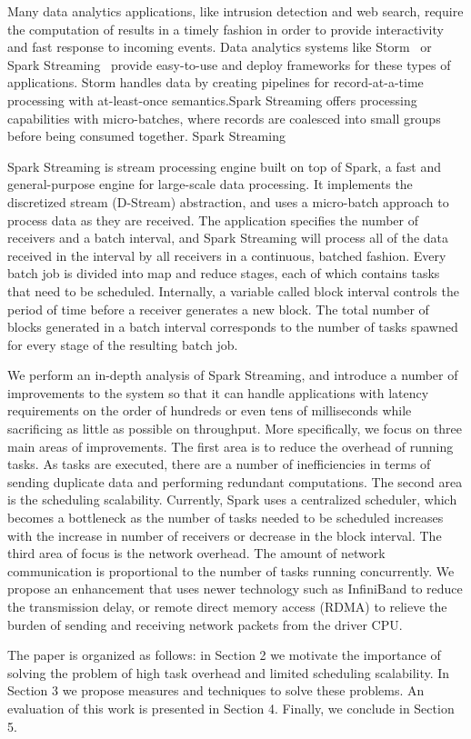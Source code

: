 \noindent

Many data analytics applications, like intrusion detection and web search, require the computation of results in a timely fashion in order to provide interactivity and fast response to incoming events.
Data analytics systems like Storm~\cite{Storm} or Spark Streaming~\cite{SparkStreaming} provide easy-to-use and deploy frameworks for these types of applications. Storm handles data by creating pipelines for record-at-a-time processing with at-least-once semantics.Spark Streaming offers processing capabilities with micro-batches, where records are coalesced into small groups before being consumed together.
Spark Streaming 


Spark Streaming is stream processing engine built on top of Spark, a fast and general-purpose engine for large-scale data processing. It implements the discretized stream (D-Stream) abstraction, and uses a micro-batch approach to process data as they are received. The application specifies the number of receivers and a batch interval, and Spark Streaming will process all of the data received in the interval by all receivers in a continuous, batched fashion. Every batch job is divided into map and reduce stages, each of which contains tasks that need to be scheduled. Internally, a variable called block interval controls the period of time before a receiver generates a new block. The total number of blocks generated in a batch interval corresponds to the number of tasks spawned for every stage of the resulting batch job.

We perform an in-depth analysis of Spark Streaming, and introduce a number of improvements to the system so that it can handle applications with latency requirements on the order of hundreds or even tens of milliseconds while sacrificing as little as possible on throughput. More specifically, we focus on three main areas of improvements. The first area is to reduce the overhead of running tasks. As tasks are executed, there are a number of inefficiencies in terms of sending duplicate data and performing redundant computations. The second area is the scheduling scalability. Currently, Spark uses a centralized scheduler, which becomes a bottleneck as the number of tasks needed to be scheduled increases with the increase in number of receivers or decrease in the block interval. The third area of focus is the network overhead. The amount of network communication is proportional to the number of tasks running concurrently. We propose an enhancement that uses newer technology such as InfiniBand to reduce the transmission delay, or remote direct memory access (RDMA) to relieve the burden of sending and receiving network packets from the driver CPU.

The paper is organized as follows: in Section 2 we motivate the importance of solving the problem of high task overhead and limited scheduling scalability. In Section 3 we propose measures and techniques to solve these problems. An evaluation of this work is presented in Section 4. Finally, we conclude in Section 5.

